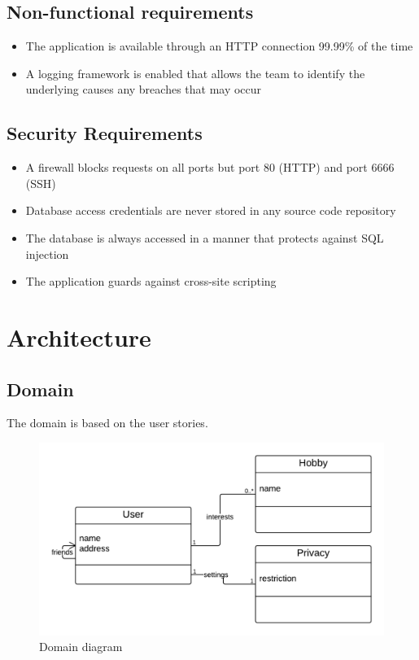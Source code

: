\documentclass[a4paper]{article}
\begin{document}
\subsection{Non-functional requirements}
\begin{itemize}
\item The application is available through an HTTP connection 99.99\% of the time
\item A logging framework is enabled that allows the team to identify the underlying causes any breaches that may occur
\end{itemize}

\subsection{Security Requirements}
\begin{itemize}
\item A firewall blocks requests on all ports but port 80 (HTTP) and port 6666 (SSH)
\item Database access credentials are never stored in any source code repository
\item The database is always accessed in a manner that protects against SQL injection
\item The application guards against cross-site scripting
\end{itemize}

\section{Architecture}

\subsection{Domain}
The domain is based on the user stories.

\begin{figure}[h!]
\centering
\includegraphics[scale=0.3]{Domain}
\caption{Domain diagram}
\label{fig:domain_diagram}
\end{figure}
\end{document}
